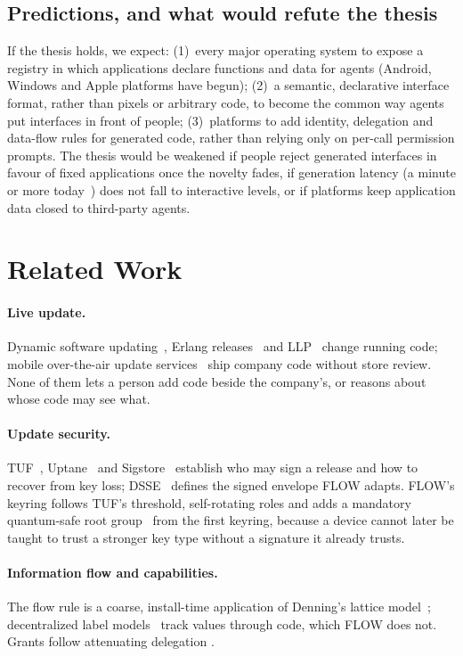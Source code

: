 \documentclass[10pt,twocolumn]{article}
\begin{document}
\subsection{Predictions, and what would refute the thesis}

If the thesis holds, we expect: (1)~every major operating system to expose a registry in which
applications declare functions and data for agents (Android, Windows and Apple platforms have
begun); (2)~a semantic, declarative interface format, rather than pixels or arbitrary code, to become
the common way agents put interfaces in front of people; (3)~platforms to add identity, delegation
and data-flow rules for generated code, rather than relying only on per-call permission prompts.
The thesis would be weakened if people reject generated interfaces in favour of fixed applications
once the novelty fades, if generation latency (a minute or more today~\cite{googlegenui2025}) does
not fall to interactive levels, or if platforms keep application data closed to third-party agents.

\section{Related Work}

\paragraph{Live update.} Dynamic software updating~\cite{hicks2005dsu}, Erlang
releases~\cite{armstrong2003} and LLP~\cite{llp2026} change running code; mobile over-the-air update
services~\cite{expoupdates} ship company code without store review. None of them lets a person add
code beside the company's, or reasons about whose code may see what.

\paragraph{Update security.} TUF~\cite{samuel2010tuf}, Uptane~\cite{kuppusamy2016uptane} and
Sigstore~\cite{newman2022sigstore} establish who may sign a release and how to recover from key
loss; DSSE~\cite{dsse} defines the signed envelope FLOW adapts. FLOW's keyring follows TUF's
threshold, self-rotating roles and adds a mandatory quantum-safe root group~\cite{fips205} from the
first keyring, because a device cannot later be taught to trust a stronger key type without a
signature it already trusts.

\paragraph{Information flow and capabilities.} The flow rule is a coarse, install-time application of
Denning's lattice model~\cite{denning1976lattice}; decentralized label models~\cite{myers1997dlm}
track values through code, which FLOW does not. Grants follow attenuating delegation
\cite{birgisson2014macaroons,miller2006robust}.
\end{document}
